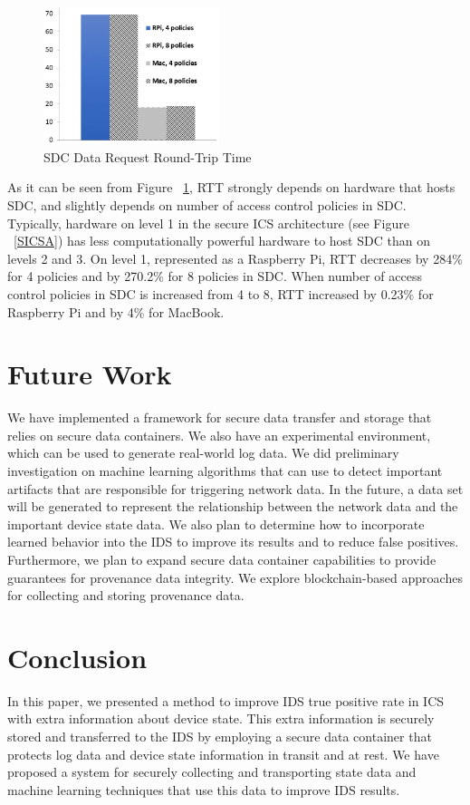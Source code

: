 \documentclass[conference]{IEEEtran}
\begin{document}
\begin{figure}[htbp]
\centering
\centerline{\includegraphics [width=.3\textwidth, height=4cm]{SDC-Eval-Plat.png}}
\caption{SDC Data Request Round-Trip Time}
\label{eval-sdc}
\end{figure}

As it can be seen from Figure ~\ref{eval-sdc}, RTT strongly depends on hardware that hosts SDC, and slightly depends on number of access control policies in SDC. Typically, hardware on level 1 in the secure ICS architecture (see Figure ~\ref{SICSA}) has less computationally powerful hardware to host SDC than on levels 2 and 3. On level 1, represented as a Raspberry Pi, RTT decreases by 284\% for 4 policies and by 270.2\% for 8 policies in SDC. When number of access control policies in SDC is increased from 4 to 8, RTT increased by 0.23\% for Raspberry Pi and by 4\% for MacBook.     

\section{Future Work}
We have implemented a framework for secure data transfer and storage that relies on secure data containers. We also have an experimental environment, which can be used to generate real-world log data. We did preliminary investigation on machine learning algorithms that can use to detect important artifacts that are responsible for triggering network data. In the future, a data set will be generated to represent the relationship between the network data and the important device state data. We also plan to determine how to incorporate learned behavior into the IDS to improve its results and to reduce false positives. Furthermore, we plan to expand secure data container capabilities to provide guarantees for provenance data integrity. We explore blockchain-based approaches for collecting and storing provenance data.   

\section{Conclusion}
In this paper, we presented a method to improve IDS true positive rate in ICS with extra information about device state. This extra information is securely stored and transferred to the IDS by employing a secure data container that protects log data and device state information in transit and at rest. We have proposed a system for securely collecting and transporting state data and machine learning techniques that use this data to improve IDS results. 
\end{document}
